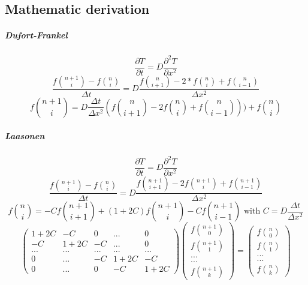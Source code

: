 \documentclass[12pt, a4paper]{report}
\begin{document}
\begin{appendix}
\clearpage
{}
\chapter{Mathematic derivation}
 
\paragraph{Dufort-Frankel}
\begin{equation}\frac{\partial T}{\partial t} = D\frac{\partial^2T }{\partial x^2}
\end{equation} 
\begin{equation}\frac{f\binom{n+1}{i} - f\binom{n}{i}}{\Delta t} = D\frac{f\binom{n}{i+1} - 2*f\binom{n}{i} +f\binom{n}{i-1}}{\Delta x^{2}}
\end{equation} 
\begin{equation}
f\binom{n+1}{i} = D\frac{\Delta t}{\Delta x^{2}}(f\binom{n}{i+1}-2f\binom{n}{i}+f\binom{n}{i-1}))+f\binom{n}{i}
\end{equation} 
\paragraph{Laasonen}
\begin{equation}\frac{\partial T}{\partial t} = D\frac{\partial^2T }{\partial x^2}
\end{equation} 
\begin{equation}\frac{f\binom{n+1}{i} - f\binom{n}{i}}{\Delta t} = D\frac{f\binom{n+1}{i+1} - 2f\binom{n+1}{i}+ f\binom{n+1}{i-1}}{\Delta x^{2}}
\end{equation} 
\begin{equation}f\binom{n}{i} = -Cf\binom{n+1}{i+1}+(1+2C)f\binom{n+1}{i}-Cf\binom{n+1}{i-1}
   \text{ with }
C = D\frac{\Delta t}{\Delta x^{2}}
\end{equation}
\begin{equation}
\begin{pmatrix}
1+2C & -C & 0 & ... & 0\\
-C & 1+2C & -C& ... & 0\\
...&...&...&...&...\\
 0 & ...& -C &1+2C & -C \\
0 & ... &  0& -C & 1+2C
\end{pmatrix}
\begin{pmatrix}
f\binom{n+1}{0}\\
f\binom{n+1}{1}\\
...\\
...\\
f\binom{n+1}{k}
\end{pmatrix}
=
\begin{pmatrix}
f\binom{n}{0}\\
f\binom{n}{1}\\
...\\
...\\
f\binom{n}{k}
\end{pmatrix}
\end{equation}

\end{appendix}
\end{document}
